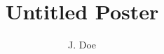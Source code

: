 \documentclass[dvipdfmx]{beamer}
\title{Untitled Poster}
\author{J. Doe}
\begin{document}
\begin{frame}
\begin{columns}[t]
    \begin{column}{0.48\linewidth}
    \end{column}
    \begin{column}{0.48\linewidth}
    \end{column}
\end{columns}
\end{frame}
\end{document}
